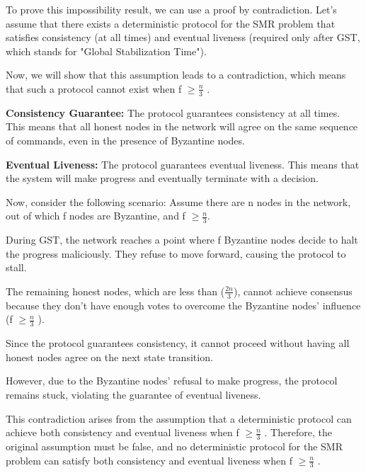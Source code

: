 \documentclass{article}
\begin{document}
\begin{enumerate}
To prove this impossibility result, we can use a proof by contradiction. Let's assume that there exists a deterministic protocol for the SMR problem that satisfies consistency (at all times) and eventual liveness (required only after GST, which stands for "Global Stabilization Time").

Now, we will show that this assumption leads to a contradiction, which means that such a protocol cannot exist when f $\geq \frac{n}{3}$ .

\textbf{Consistency Guarantee:} The protocol guarantees consistency at all times. This means that all honest nodes in the network will agree on the same sequence of commands, even in the presence of Byzantine nodes.

\textbf{Eventual Liveness:} The protocol guarantees eventual liveness. This means that the system will make progress and eventually terminate with a decision.

Now, consider the following scenario:
Assume there are n nodes in the network, out of which f nodes are Byzantine, and f $\geq \frac{n}{3}$.

During GST, the network reaches a point where f Byzantine nodes decide to halt the progress maliciously. They refuse to move forward, causing the protocol to stall.

The remaining honest nodes, which are less than ($\frac{2n}{3}$), cannot achieve consensus because they don't have enough votes to overcome the Byzantine nodes' influence (f $\geq \frac{n}{3}$ ).

Since the protocol guarantees consistency, it cannot proceed without having all honest nodes agree on the next state transition.

However, due to the Byzantine nodes' refusal to make progress, the protocol remains stuck, violating the guarantee of eventual liveness.

This contradiction arises from the assumption that a deterministic protocol can achieve both consistency and eventual liveness when f $\geq \frac{n}{3}$ . Therefore, the original assumption must be false, and no deterministic protocol for the SMR problem can satisfy both consistency and eventual liveness when f $\geq \frac{n}{3}$ .
\end{enumerate}
\end{document}
